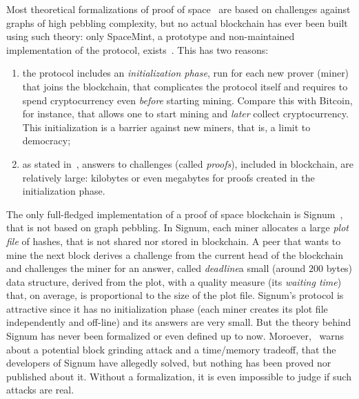 Most theoretical formalizations of proof of space~\cite{AtenieseBFG14,DziembowskiFKP15,RenD16} are
based on challenges against graphs of high pebbling complexity, but
no actual blockchain has ever been built using such theory: only SpaceMint, a prototype and non-maintained
implementation of the protocol, exists~\cite{ParkKFGAP18}. This has two reasons:
%
\begin{enumerate}
\item the protocol includes an \emph{initialization phase},
  run for each new prover (miner) that joins the blockchain,
  that complicates the protocol itself and
  requires to spend cryptocurrency even \emph{before}
  starting mining. Compare this with Bitcoin, for instance, that allows one to start mining
  and \emph{later} collect cryptocurrency. This initialization is a barrier against new
  miners, that is, a limit to democracy;
\item as stated in~\cite{AbusalahACKPR17}, answers to challenges (called \emph{proofs}),
  included in blockchain, are relatively large:
  kilobytes or even megabytes for proofs created in the initialization phase.
\end{enumerate}
%
The only full-fledged implementation of a proof of space blockchain is Signum~\cite{Signum},
that is not based on graph pebbling.
In Signum, each miner allocates a large \emph{plot file} of hashes, that is not shared nor
stored in blockchain.
A peer that wants to mine the next block derives a challenge from the current head of the blockchain
and challenges the miner for an answer, called
\emph{deadline}\ie a small (around $200$ bytes) data structure, derived from the plot, with a quality measure
(its \emph{waiting time}) that, on average, is proportional to the size of the plot file.
Signum's protocol is attractive since it has no initialization phase (each miner creates its plot file
independently and off-line) and its answers are very small.
But the theory behind Signum has never been formalized
or even defined up to now.
Moroever, \cite{ParkKFGAP18}~warns about a potential block grinding attack and
a time/memory tradeoff, that the developers of Signum have allegedly solved,
but nothing has been proved nor published about it. Without a formalization, it is
even impossible to judge if such attacks are real.

